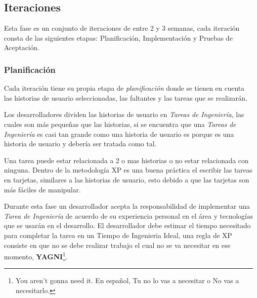 
         \subsection{Iteraciones}
         \label{sub:iteracion}


           Esta fase es un conjunto de iteraciones de entre 2 y 3 semanas, cada iteración consta de las siguientes etapas: Planificación, Implementación y Pruebas de Aceptación.


           \subsubsection{Planificación}


           Cada iteración tiene su propia etapa de \emph{planificación} donde se tienen en cuenta las historias de usuario seleccionadas, las faltantes y las tareas que se realizarán.

             Los desarrolladores dividen las historias de usuario en \emph{Tareas de Ingeniería}, las cuales son más pequeñas que las historias, si se encuentra que una \emph{Tareas de Ingeniería} es casi tan grande como una historia de usuario es porque es una historia de usuario y debería ser tratada como tal.

             Una tarea puede estar relacionada a 2 o mas historias o no estar relacionada con ninguna. Dentro de la metodología XP es una buena práctica el escribir las tareas en tarjetas, similares a las historias de usuario, esto debido a que las tarjetas son más fáciles de manipular.

             Durante esta fase un desarrollador acepta la responsabilidad de implementar una \emph{Tarea de Ingeniería} de acuerdo de su experiencia personal en el área y tecnologías que se usarán en el desarrollo. El desarrollador debe estimar el tiempo necesitado para completar la tarea en un Tiempo de Ingenieria Ideal, una regla de XP consiste en que no se debe realizar trabajo el cual no se va necesitar en ese momento, \textbf{YAGNI}\footnote{You aren't gonna need it. En español, Tu no lo vas a necesitar o No vas a necesitarlo.}.


